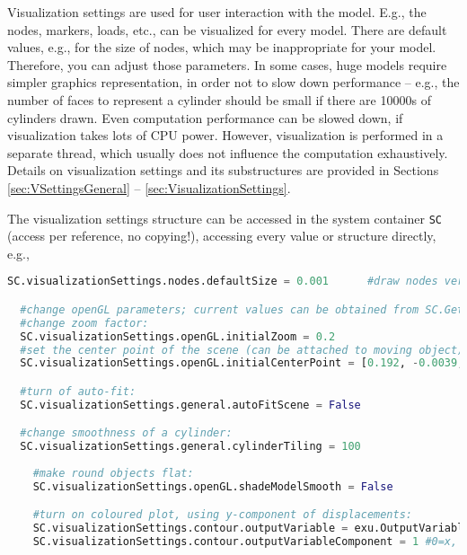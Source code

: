 %
Visualization settings are used for user interaction with the model. E.g., the nodes, markers, loads, etc., can be visualized for every model. There are default values, e.g., for the size of nodes, which may be inappropriate for your model. Therefore, you can adjust those parameters. In some cases, huge models require simpler graphics representation, in order not to slow down performance -- e.g., the number of faces to represent a cylinder should be small if there are 10000s of cylinders drawn. Even computation performance can be slowed down, if visualization takes lots of CPU power. However, visualization is performed in a separate thread, which usually does not influence the computation exhaustively.
Details on visualization settings and its substructures are provided in Sections \ref{sec:VSettingsGeneral} -- \ref{sec:VisualizationSettings}.

The visualization settings structure can be accessed in the system container \texttt{SC} (access per reference, no copying!), accessing every value or structure directly, e.g.,
\pythonstyle
\begin{lstlisting}[language=Python, firstnumber=1]
  SC.visualizationSettings.nodes.defaultSize = 0.001      #draw nodes very small

  #change openGL parameters; current values can be obtained from SC.GetRenderState()
  #change zoom factor:
  SC.visualizationSettings.openGL.initialZoom = 0.2       
  #set the center point of the scene (can be attached to moving object):
  SC.visualizationSettings.openGL.initialCenterPoint = [0.192, -0.0039,-0.075]

  #turn of auto-fit:
  SC.visualizationSettings.general.autoFitScene = False

  #change smoothness of a cylinder:
  SC.visualizationSettings.general.cylinderTiling = 100
	
	#make round objects flat:
	SC.visualizationSettings.openGL.shadeModelSmooth = False

	#turn on coloured plot, using y-component of displacements:
	SC.visualizationSettings.contour.outputVariable = exu.OutputVariableType.Displacement
	SC.visualizationSettings.contour.outputVariableComponent = 1 #0=x, 1=y, 2=z
\end{lstlisting}


